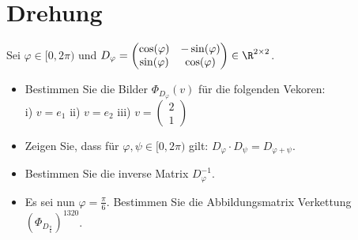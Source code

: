 \newpage
\section{Drehung}

Sei $\varphi \in [0,2\pi)$ und 
$
	D_\varphi=\begin{pmatrix}
		\cos(\varphi)	&-\sin(\varphi)	\\
		\sin(\varphi)	&\cos(\varphi)
	\end{pmatrix}
	\in \R^{2\times 2}$.
\begin{itemize}
\item[a)] Bestimmen Sie die Bilder $\Phi_{D_\varphi}(v)$ für die folgenden Vekoren:\\
i) $v=e_1$ \quad ii) $v=e_2$ \quad iii) $v=\begin{pmatrix} 2 \\ 1 \end{pmatrix}$
\item[b)] Zeigen Sie, dass für $\varphi, \psi \in [0,2\pi)$ gilt: $D_\varphi \cdot D_\psi = D_{\varphi+\psi}$.
\item[c)] Bestimmen Sie die inverse Matrix $D_\varphi^{-1}$.
\item[d)] Es sei nun $\varphi=\frac{\pi}{6}$. Bestimmen Sie die Abbildungsmatrix Verkettung $(\Phi_{D_{\frac{\pi}{6}}})^{1320}$.
\end{itemize}

